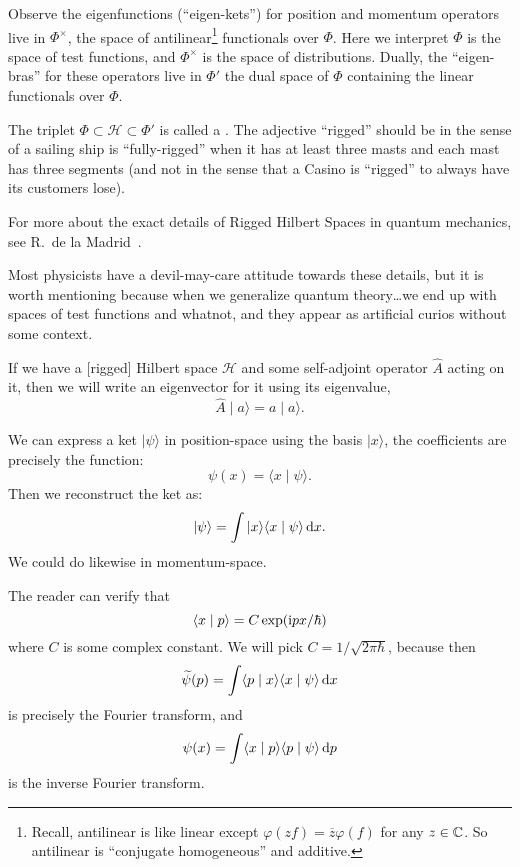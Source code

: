 Observe the eigenfunctions (``eigen-kets'') for position and momentum operators live in
$\Phi^{\times}$, the space of antilinear\footnote{Recall, antilinear is
like linear except $\varphi(zf)=\overline{z}\varphi(f)$ for any
$z\in\mathbb{C}$. So antilinear is ``conjugate homogeneous'' and additive.} functionals over $\Phi$. Here
we interpret $\Phi$ is the space of test
functions, and
$\Phi^{\times}$ is the space of distributions.
Dually, the ``eigen-bras'' for these operators live in $\Phi'$ the dual
space of $\Phi$ containing the linear functionals over $\Phi$.

The triplet $\Phi\subset\mathcal{H}\subset\Phi'$ is called a
. The adjective ``rigged'' should be in the
sense of a sailing ship is ``fully-rigged'' when it has at least three
masts and each mast has three segments (and not
in the sense that a Casino is ``rigged'' to always have its customers
lose).

For more about the exact details of Rigged Hilbert Spaces in quantum
mechanics, see R.~de la Madrid~\cite{Madrid:2005rs}.

Most physicists have a devil-may-care attitude towards these details,
but it is worth mentioning because when we generalize quantum
theory\dots we end up with spaces of test functions and whatnot, and
they appear as artificial curios without some context.

If we have a [rigged] Hilbert space $\mathcal{H}$ and some self-adjoint
operator $\widehat{A}$ acting on it, then we will write an eigenvector
for it using its eigenvalue,
\begin{equation}
\widehat{A}\mid a\rangle = a\mid a\rangle.
\end{equation}

\M
We can express a ket $|\psi\rangle$ in position-space using the basis
$|x\rangle$, the coefficients are precisely the function:
\begin{equation}
\psi(x) = \langle x\mid\psi\rangle.
\end{equation}
Then we reconstruct the ket as:
\begin{equation}
|\psi\rangle = \int | x\rangle\langle x\mid\psi\rangle\,\mathrm{d} x.
\end{equation}
We could do likewise in momentum-space.

The reader can verify that
\begin{equation}
\langle x\mid p\rangle = C\exp(\mathrm{i} px/\hbar)
\end{equation}
where $C$ is some complex constant. We will pick $C=1/\sqrt{2\pi\hbar}$,
because then
\begin{equation}
\widetilde{\psi}(p) = \int\langle p\mid x\rangle\langle x\mid\psi\rangle\,\mathrm{d} x
\end{equation}
is precisely the Fourier transform, and
\begin{equation}
\psi(x) = \int\langle x\mid p\rangle\langle p\mid\psi\rangle\,\mathrm{d} p
\end{equation}
is the inverse Fourier transform.

